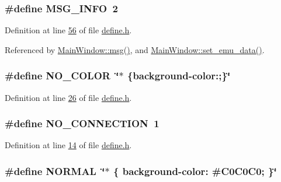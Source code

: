 \hypertarget{a00034_a1ddcc97224a95cec04b38b0ac866fa19}{
\subsubsection[{M\+S\+G\+\_\+\+I\+N\+F\+O}]{\setlength{\rightskip}{0pt plus 5cm}\#define M\+S\+G\+\_\+\+I\+N\+F\+O~2}}\label{a00034_a1ddcc97224a95cec04b38b0ac866fa19}


Definition at line \hyperlink{a00034_source_l00056}{56} of file \hyperlink{a00034_source}{define.\+h}.



Referenced by \hyperlink{a00038_source_l00145}{Main\+Window\+::msg()}, and \hyperlink{a00047_source_l00606}{Main\+Window\+::set\+\_\+emu\+\_\+data()}.

\hypertarget{a00034_a69d859e537f858ca285d77a66755ded6}{
\subsubsection[{N\+O\+\_\+\+C\+O\+L\+O\+R}]{\setlength{\rightskip}{0pt plus 5cm}\#define N\+O\+\_\+\+C\+O\+L\+O\+R~\char`\"{}$\ast$ \{background-\/color\+:;\}\char`\"{}}}\label{a00034_a69d859e537f858ca285d77a66755ded6}


Definition at line \hyperlink{a00034_source_l00026}{26} of file \hyperlink{a00034_source}{define.\+h}.

\hypertarget{a00034_ae85d2d9036fe89b7201a98b2b3a091d2}{
\subsubsection[{N\+O\+\_\+\+C\+O\+N\+N\+E\+C\+T\+I\+O\+N}]{\setlength{\rightskip}{0pt plus 5cm}\#define N\+O\+\_\+\+C\+O\+N\+N\+E\+C\+T\+I\+O\+N~1}}\label{a00034_ae85d2d9036fe89b7201a98b2b3a091d2}


Definition at line \hyperlink{a00034_source_l00014}{14} of file \hyperlink{a00034_source}{define.\+h}.

\hypertarget{a00034_a1291f416b069313021b519eea62d5bf1}{
\subsubsection[{N\+O\+R\+M\+A\+L}]{\setlength{\rightskip}{0pt plus 5cm}\#define N\+O\+R\+M\+A\+L~\char`\"{}$\ast$ \{ background-\/color\+: \#C0\+C0\+C0; \}\char`\"{}}}\label{a00034_a1291f416b069313021b519eea62d5bf1}


